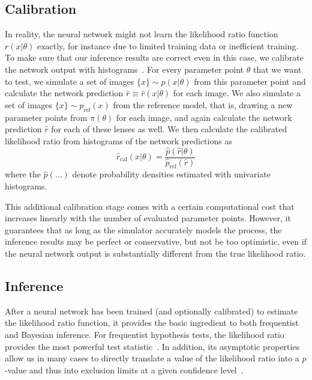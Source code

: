 \documentclass[twocolumn]{aastex62}
\begin{document}
\subsection{Calibration}
\label{sec:lfi-calibration}

In reality, the neural network might not learn the likelihood ratio function $r(x|\theta)$ exactly, for instance due to limited training data or inefficient training. To make sure that our inference results are correct even in this case, we calibrate the network output with histograms~\citep{Cranmer:2015bka, 1805.00020}. For every parameter point $\theta$ that we want to test, we simulate a set of images $\{x\} \sim p(x|\theta)$ from this parameter point and calculate the network prediction $\hat{r} \equiv \hat{r}(x|\theta)$ for each image. We also simulate a set of images $\{x\} \sim p_{\mathrm{ref}}(x)$ from the reference model, that is, drawing a new parameter points from $\pi(\theta)$ for each image, and again calculate the network prediction $\hat{r}$ for each of these lenses as well. We then calculate the calibrated likelihood ratio from histograms of the network predictions as
%
\begin{equation}
  \hat{r}_\mathrm{cal}(x|\theta)
  = \frac {\hat{p}( \hat{r} | \theta )} {\hat{p}_\mathrm{ref}(\hat{r})}
\end{equation}
%
where the $\hat{p}(\dots)$ denote probability densities estimated with univariate histograms.

This additional calibration stage comes with a certain computational cost that increases linearly with the number of evaluated parameter points. However, it guarantees that as long as the simulator accurately models the process, the inference results may be perfect or conservative, but not be too optimistic, even if the neural network output is substantially different from the true likelihood ratio.


\subsection{Inference}
\label{sec:lfi-inference}

After a neural network has been trained (and optionally calibrated) to estimate the likelihood ratio function, it provides the basic ingredient to both frequentist and Bayesian inference. For frequentist hypothesis tests, the likelihood ratio provides the most powerful test statistic~\citep{1933RSPTA.231..289N}. In addition, its asymptotic properties allow us in many cases to directly translate a value of the likelihood ratio into a $p$-value and thus into exclusion limits at a given confidence level~\citep{Wilks:1938dza, Wald, Cowan:2010js}.
\end{document}
